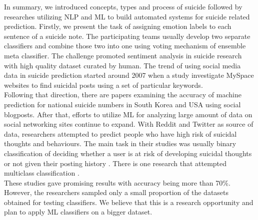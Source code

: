 In summary, we introduced concepts, types and process of suicide followed by researches utilizing NLP and ML to build automated systems for suicide related prediction. Firstly, we present the task of assigning emotion labels to each sentence of a suicide note. The participating teams usually develop two separate classifiers and combine those two into one using voting mechanism of ensemble meta classifier. The challenge promoted sentiment analysis in suicide research with high quality dataset curated by human. The trend of using social media data in suicide prediction started around 2007 when a study investigate MySpace websites to find suicidal posts using a set of particular keywords.\\
Following that direction, there are papers examining the accuracy of machine prediction for national suicide numbers in South Korea and USA using social blogposts. After that, efforts to utilize ML for analyzing large amount of data on social networking sites continue to expand. With Reddit and Twitter as source of data, researchers attempted to predict people who have high risk of suicidal thoughts and behaviours. The main task in their studies was usually binary classification of deciding whether a user is at risk of developing suicidal thoughts or not given their posting history \cite{DeChoudhury2017, DeChoudhury2017, Coppersmith2016} . There is one research that attempted multiclass classification \cite{Burnap2015}.\\
These studies gave promising results with accuracy being more than 70\%. However, the researchers sampled only a small proportion of the datasets obtained for testing classifiers. We believe that this is a research opportunity and plan to apply ML classifiers on a bigger dataset.  




  

